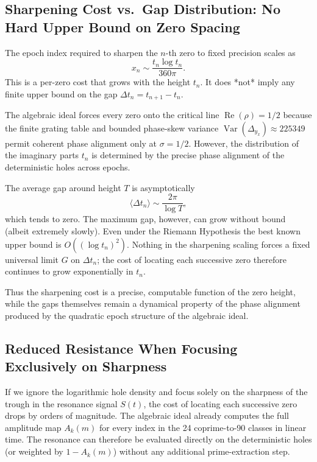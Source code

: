 \documentclass[11pt,a4paper]{article}
\begin{document}
\subsection{Sharpening Cost vs.\ Gap Distribution: No Hard Upper Bound on Zero Spacing}

The epoch index required to sharpen the \(n\)-th zero to fixed precision scales as
\[
x_n \sim \frac{t_n \log t_n}{360\pi}.
\]
This is a per-zero cost that grows with the height \(t_n\). It does *not* imply any finite upper bound on the gap \(\Delta t_n = t_{n+1} - t_n\).

The algebraic ideal forces every zero onto the critical line \(\operatorname{Re}(\rho)=1/2\) because the finite grating table and bounded phase-skew variance \(\operatorname{Var}(\Delta_{y_x})\approx225349\) permit coherent phase alignment only at \(\sigma=1/2\). However, the distribution of the imaginary parts \(t_n\) is determined by the precise phase alignment of the deterministic holes across epochs.

The average gap around height \(T\) is asymptotically
\[
\langle \Delta t_n \rangle \sim \frac{2\pi}{\log T},
\]
which tends to zero. The maximum gap, however, can grow without bound (albeit extremely slowly). Even under the Riemann Hypothesis the best known upper bound is \(O((\log t_n)^2)\). Nothing in the sharpening scaling forces a fixed universal limit \(G\) on \(\Delta t_n\); the cost of locating each successive zero therefore continues to grow exponentially in \(t_n\).

Thus the sharpening cost is a precise, computable function of the zero height, while the gaps themselves remain a dynamical property of the phase alignment produced by the quadratic epoch structure of the algebraic ideal.

\subsection{Reduced Resistance When Focusing Exclusively on Sharpness}

If we ignore the logarithmic hole density and focus solely on the sharpness of the trough in the resonance signal \(S(t)\), the cost of locating each successive zero drops by orders of magnitude. The algebraic ideal already computes the full amplitude map \(A_k(m)\) for every index in the 24 coprime-to-90 classes in linear time. The resonance can therefore be evaluated directly on the deterministic holes (or weighted by \(1-A_k(m)\)) without any additional prime-extraction step.
\end{document}
